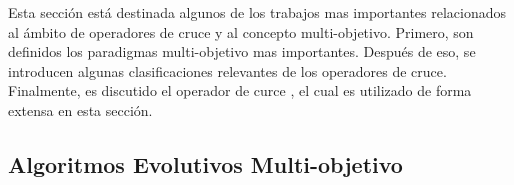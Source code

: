 Esta sección está destinada algunos de los trabajos mas importantes relacionados al ámbito de operadores de cruce y al concepto multi-objetivo.
%
Primero, son definidos los paradigmas multi-objetivo mas importantes.
%
Después de eso, se introducen algunas clasificaciones relevantes de los operadores de cruce.
%
Finalmente, es discutido el operador de curce \SBX{}, el cual es utilizado de forma extensa en esta sección.

\subsection{Algoritmos Evolutivos Multi-objetivo}

